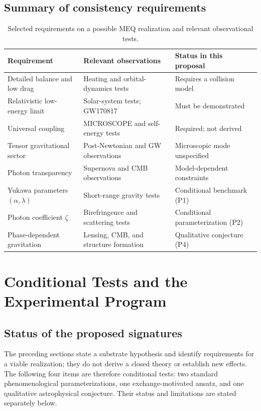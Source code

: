 \documentclass[11pt,a4paper]{article}
\newcommand{\meq}{MEQ}
\begin{document}
\subsection{Summary of consistency requirements}

\begin{table}[htbp]
\centering\small
\caption{Selected requirements on a possible \meq{} realization and relevant observational tests.}
\begin{tabular}{@{}>{\raggedright\arraybackslash}p{}>{\raggedright\arraybackslash}p{}>{\raggedright\arraybackslash}p{}@{}}
\toprule
Requirement & Relevant observations & Status in this proposal \\
\midrule
Detailed balance and low drag & Heating and orbital-dynamics tests & Requires a collision model \\
Relativistic low-energy limit & Solar-system tests; GW170817 & Must be demonstrated \\
Universal coupling & MICROSCOPE and self-energy tests & Required; not derived \\
Tensor gravitational sector & Post-Newtonian and GW observations & Microscopic mode unspecified \\
Photon transparency & Supernova and CMB observations & Model-dependent constraints \\
Yukawa parameters $(\alpha,\lambda)$ & Short-range gravity tests & Conditional benchmark (P1) \\
Photon coefficient $\zeta$ & Birefringence and scattering tests & Conditional parameterization (P2) \\
Phase-dependent gravitation & Lensing, CMB, and structure formation & Qualitative conjecture (P4) \\
\bottomrule
\end{tabular}
\end{table}

\section{Conditional Tests and the Experimental Program}\label{sec:pred}

\subsection{Status of the proposed signatures}

The preceding sections state a substrate hypothesis and identify requirements for a viable
realization; they do not derive a closed theory or establish new effects. The following four
items are therefore conditional tests: two standard phenomenological parameterizations, one
exchange-motivated ansatz, and one qualitative astrophysical conjecture. Their status and
limitations are stated separately below.
\end{document}
